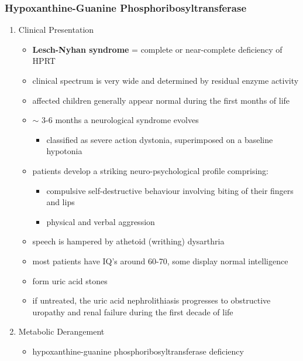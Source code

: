 \documentclass[12pt]{scrartcl}
\begin{document}
\subsubsection{Hypoxanthine-Guanine Phosphoribosyltransferase}
\label{sec:org9f90eb1}
\begin{enumerate}
\item Clinical Presentation
\label{sec:org06bde35}
\begin{itemize}
\item \textbf{Lesch-Nyhan syndrome} = complete or near-complete deficiency of HPRT
\item clinical spectrum is very wide and determined by residual enzyme activity
\item affected children generally appear normal during the first months of
life
\item \(\sim\) 3-6 months a neurological syndrome evolves
\begin{itemize}
\item classified as severe action dystonia, superimposed on a baseline hypotonia
\end{itemize}
\item patients develop a striking neuro-psychological profile comprising:
\begin{itemize}
\item compulsive self-destructive behaviour involving biting of their
fingers and lips
\item physical and verbal aggression
\end{itemize}
\item speech is hampered by athetoid (writhing) dysarthria
\item most patients have IQ’s around 60-70, some display normal intelligence
\item form uric acid stones
\item if untreated, the uric acid nephrolithiasis progresses to
obstructive uropathy and renal failure during the first decade of
life
\end{itemize}

\item Metabolic Derangement
\label{sec:org06b20d1}
\begin{itemize}
\item hypoxanthine-guanine phosphoribosyltransferase deficiency
\end{itemize}




\end{enumerate}
\end{document}

